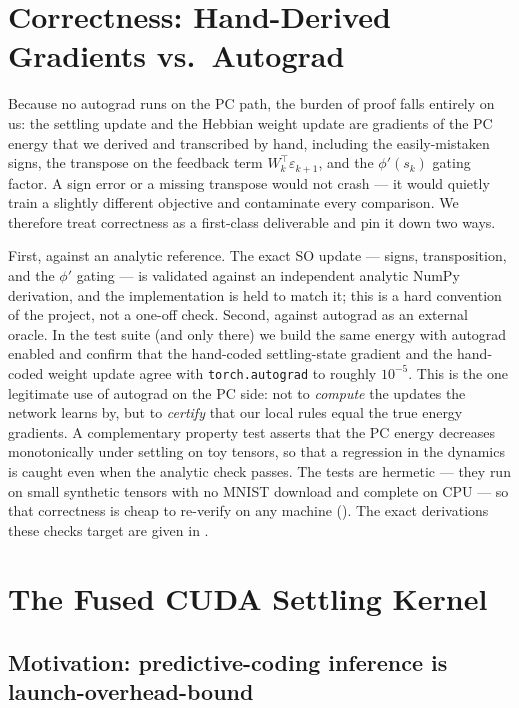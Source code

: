 \section{Correctness: Hand-Derived Gradients vs.\ Autograd}\label{sec:method-correctness}

Because no autograd runs on the PC path, the burden of proof falls entirely on us: the settling update
and the Hebbian weight update are gradients of the PC energy that we derived and transcribed by hand,
including the easily-mistaken signs, the transpose on the feedback term $W_k^{\!\top}\varepsilon_{k+1}$,
and the $\phi'(s_k)$ gating factor. A sign error or a missing transpose would not crash --- it would
quietly train a slightly different objective and contaminate every comparison. We therefore treat
correctness as a first-class deliverable and pin it down two ways.

First, against an analytic reference. The exact SO update --- signs, transposition, and the $\phi'$
gating --- is validated against an independent analytic NumPy derivation, and the implementation is
held to match it; this is a hard convention of the project, not a one-off check. Second, against
autograd as an external oracle. In the test suite (and only there) we build the same energy with
autograd enabled and confirm that the hand-coded settling-state gradient and the hand-coded weight
update agree with \texttt{torch.autograd} to roughly $10^{-5}$. This is the one legitimate use of
autograd on the PC side: not to \emph{compute} the updates the network learns by, but to \emph{certify}
that our local rules equal the true energy gradients. A complementary property test asserts that the PC
energy decreases monotonically under settling on toy tensors, so that a regression in the dynamics is
caught even when the analytic check passes. The tests are hermetic --- they run on small synthetic
tensors with no MNIST download and complete on CPU --- so that correctness is cheap to re-verify on any
machine (). The exact derivations these checks target are given in
.

\section{The Fused CUDA Settling Kernel}\label{sec:kernel}

\subsection{Motivation: predictive-coding inference is launch-overhead-bound}

